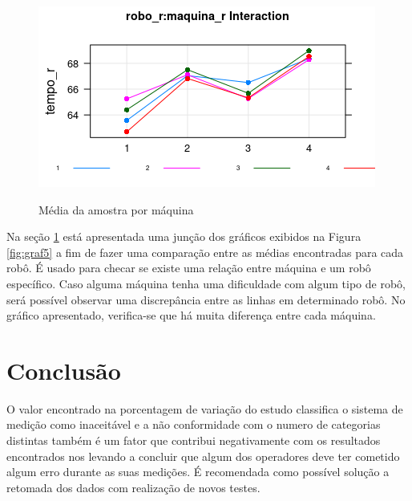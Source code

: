 \documentclass[
12pt,					%
openright,				%
oneside,				%
a4paper,				%
english,
brazil
]{ABNT/abntex2_report}
\begin{document}
\begin{figure}[H]
	\centering
	\caption{Média da amostra por máquina}
	\includegraphics[scale = 0.9]{figures/graf6.png}
	\label{fig:graf6}
\end{figure}

Na seção \ref{fig:graf6} está apresentada uma junção dos gráficos exibidos na Figura \ref{fig:graf5} a fim de fazer uma comparação entre as médias encontradas para cada robô. É usado para checar se existe uma relação entre máquina e um robô específico. Caso alguma máquina tenha uma dificuldade com algum tipo de robô, será possível observar uma discrepância entre as linhas em determinado robô. No gráfico apresentado, verifica-se que há muita diferença entre cada máquina.

\section*{Conclusão}
O valor encontrado na porcentagem de variação do estudo classifica o sistema de medição como inaceitável e a não conformidade com o numero de categorias distintas também é um fator que contribui negativamente com os resultados encontrados nos levando a concluir que algum dos operadores deve ter cometido algum erro durante as suas medições.  É recomendada como possível solução a retomada dos dados com realização de novos testes.
\end{document}
